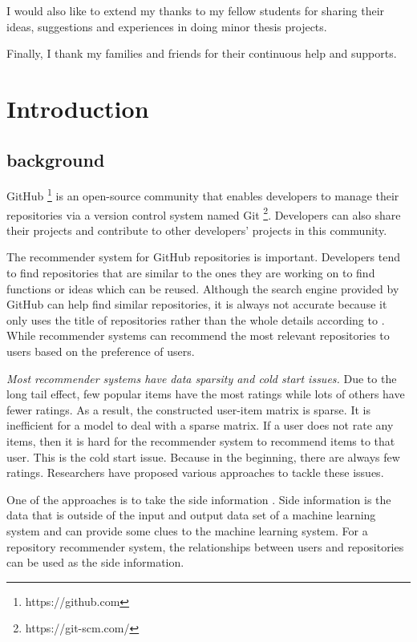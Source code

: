 \documentclass[11pt,twoside]{report}
\begin{document}
I would also like to extend my thanks to my fellow students for sharing their ideas, suggestions and experiences in doing minor thesis projects.

Finally, I thank my families and friends for their continuous help and supports.

{
    \hypersetup{linkcolor=black}
    \tableofcontents
    \listoffigures
    \listoftables
}


\chapter{Introduction}
\section{background}
GitHub \footnote{https://github.com} is an open-source community that enables developers to manage their repositories via a version control system named Git \footnote{https://git-scm.com/}. Developers can also share their projects and contribute to other developers’ projects in this community.

The recommender system for GitHub repositories is important. Developers tend to find repositories that are similar to the ones they are working on to find functions or ideas which can be reused. Although the search engine provided by GitHub can help find similar repositories, it is always not accurate because it only uses the title of repositories rather than the whole details according to \cite{xu_repersp_2017}. While recommender systems can recommend the most relevant repositories to users based on the preference of users.

\textit{Most recommender systems have data sparsity and cold start issues.} Due to the long tail effect, few popular items have the most ratings while lots of others have fewer ratings. As a result, the constructed user-item matrix is sparse. It is inefficient for a model to deal with a sparse matrix. If a user does not rate any items, then it is hard for the recommender system to recommend items to that user. This is the cold start issue. Because in the beginning, there are always few ratings. Researchers have proposed various approaches to tackle these issues.

One of the approaches is to take the side information \cite{jonschkowski_patterns_2016}. Side information is the data that is outside of the input and output data set of a machine learning system and can provide some clues to the machine learning system. For a repository recommender system, the relationships between users and repositories can be used as the side information.
\end{document}

